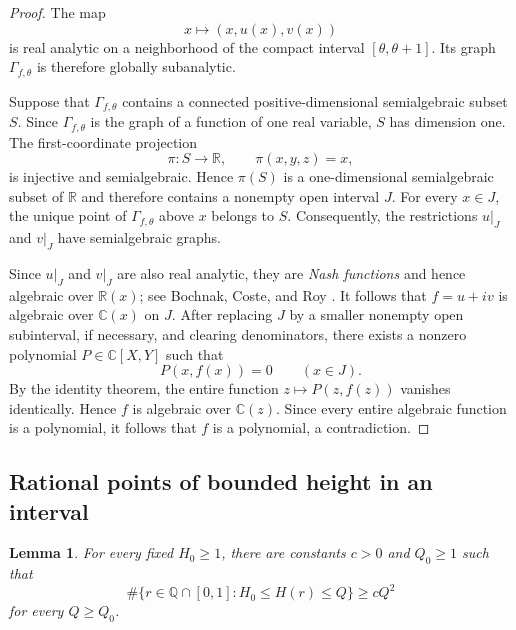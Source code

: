 \documentclass[11pt]{amsart}
\newtheorem{lemma}[theorem]{Lemma}
\theoremstyle{remark}
\newcommand{\Q}{\mathbb{Q}}
\newcommand{\R}{\mathbb{R}}
\newcommand{\C}{\mathbb{C}}
\begin{document}
\begin{proof}
The map
\[
x\longmapsto (x,u(x),v(x))
\]
is real analytic on a neighborhood of the compact interval
$[\theta,\theta+1]$. Its graph $\Gamma_{f,\theta}$ is therefore globally
subanalytic.

Suppose that $\Gamma_{f,\theta}$ contains a connected positive-dimensional
semialgebraic subset $S$. Since $\Gamma_{f,\theta}$ is the graph of a
function of one real variable, $S$ has dimension one. The first-coordinate
projection
\[
\pi:S\longrightarrow\R,
\qquad
\pi(x,y,z)=x,
\]
is injective and semialgebraic. Hence $\pi(S)$ is a one-dimensional
semialgebraic subset of $\R$ and therefore contains a nonempty open interval
$J$. For every $x\in J$, the unique point of $\Gamma_{f,\theta}$ above $x$
belongs to $S$. Consequently, the restrictions $u|_J$ and $v|_J$ have
semialgebraic graphs.

Since $u|_J$ and $v|_J$ are also real analytic, they are \textit{Nash functions} and
hence algebraic over $\R(x)$; see Bochnak, Coste, and Roy
\cite[Proposition~8.1.8]{BochnakCosteRoy1998}. It follows that
$f=u+iv$ is algebraic over $\C(x)$ on $J$. After replacing $J$ by a smaller nonempty open subinterval, if necessary,
and clearing denominators, there exists a nonzero polynomial
$P\in\C[X,Y]$ such that
\[
P(x,f(x))=0
\qquad(x\in J).
\]
By the identity theorem, the entire function $z\mapsto P(z,f(z))$ vanishes identically. Hence $f$ is algebraic over $\C(z)$. Since every entire algebraic function is a polynomial, it follows that $f$ is a polynomial, a contradiction.
\end{proof}

\subsection{Rational points of bounded height in an interval}

\begin{lemma}\label{lem:farey}
For every fixed $H_0\geq1$, there are constants $c>0$ and $Q_0\geq1$ such that
\[
\#\{r\in\Q\cap[0,1]:H_0\leq H(r)\leq Q\}
\geq cQ^2
\]
for every $Q\geq Q_0$.
\end{lemma}
\end{document}
